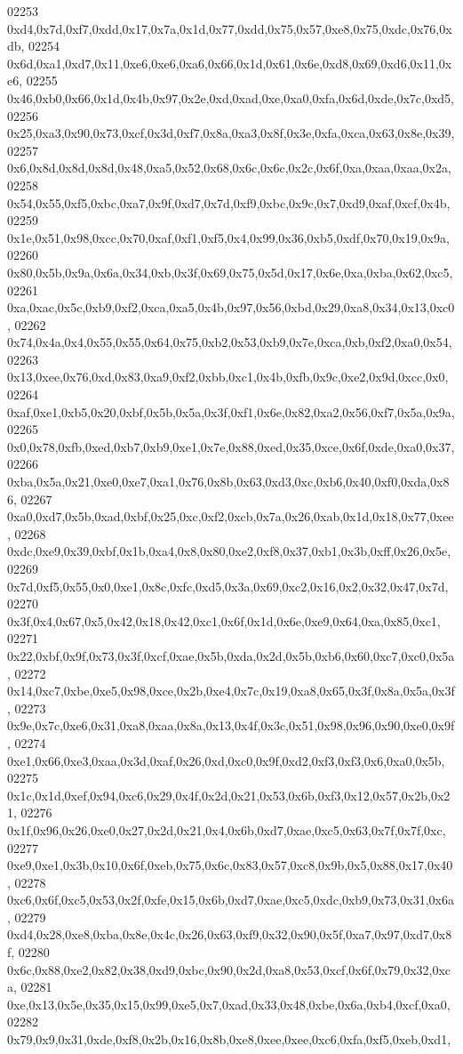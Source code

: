 \begin{DoxyCode}
02253   0xd4,0x7d,0xf7,0xdd,0x17,0x7a,0x1d,0x77,0xdd,0x75,0x57,0xe8,0x75,0xdc,0x76,0xdb,
02254   0x6d,0xa1,0xd7,0x11,0xe6,0xe6,0xa6,0x66,0x1d,0x61,0x6e,0xd8,0x69,0xd6,0x11,0xe6,
02255   0x46,0xb0,0x66,0x1d,0x4b,0x97,0x2e,0xd,0xad,0xe,0xa0,0xfa,0x6d,0xde,0x7c,0xd5,
02256   0x25,0xa3,0x90,0x73,0xcf,0x3d,0xf7,0x8a,0xa3,0x8f,0x3e,0xfa,0xca,0x63,0x8e,0x39,
02257   0x6,0x8d,0x8d,0x8d,0x48,0xa5,0x52,0x68,0x6c,0x6c,0x2c,0x6f,0xa,0xaa,0xaa,0x2a,
02258   0x54,0x55,0xf5,0xbc,0xa7,0x9f,0xd7,0x7d,0xf9,0xbc,0x9c,0x7,0xd9,0xaf,0xcf,0x4b,
02259   0x1e,0x51,0x98,0xcc,0x70,0xaf,0xf1,0xf5,0x4,0x99,0x36,0xb5,0xdf,0x70,0x19,0x9a,
02260   0x80,0x5b,0x9a,0x6a,0x34,0xb,0x3f,0x69,0x75,0x5d,0x17,0x6e,0xa,0xba,0x62,0xc5,
02261   0xa,0xac,0x5c,0xb9,0xf2,0xca,0xa5,0x4b,0x97,0x56,0xbd,0x29,0xa8,0x34,0x13,0xc0,
02262   0x74,0x4a,0x4,0x55,0x55,0x64,0x75,0xb2,0x53,0xb9,0x7e,0xca,0xb,0xf2,0xa0,0x54,
02263   0x13,0xee,0x76,0xd,0x83,0xa9,0xf2,0xbb,0xc1,0x4b,0xfb,0x9c,0xe2,0x9d,0xcc,0x0,
02264   0xaf,0xe1,0xb5,0x20,0xbf,0x5b,0x5a,0x3f,0xf1,0x6e,0x82,0xa2,0x56,0xf7,0x5a,0x9a,
02265   0x0,0x78,0xfb,0xed,0xb7,0xb9,0xe1,0x7e,0x88,0xed,0x35,0xce,0x6f,0xde,0xa0,0x37,
02266   0xba,0x5a,0x21,0xe0,0xe7,0xa1,0x76,0x8b,0x63,0xd3,0xc,0xb6,0x40,0xf0,0xda,0x86,
02267   0xa0,0xd7,0x5b,0xad,0xbf,0x25,0xc,0xf2,0xcb,0x7a,0x26,0xab,0x1d,0x18,0x77,0xee,
02268   0xdc,0xe9,0x39,0xbf,0x1b,0xa4,0x8,0x80,0xe2,0xf8,0x37,0xb1,0x3b,0xff,0x26,0x5e,
02269   0x7d,0xf5,0x55,0x0,0xe1,0x8c,0xfc,0xd5,0x3a,0x69,0xc2,0x16,0x2,0x32,0x47,0x7d,
02270   0x3f,0x4,0x67,0x5,0x42,0x18,0x42,0xc1,0x6f,0x1d,0x6e,0xe9,0x64,0xa,0x85,0xc1,
02271   0x22,0xbf,0x9f,0x73,0x3f,0xcf,0xae,0x5b,0xda,0x2d,0x5b,0xb6,0x60,0xc7,0xc0,0x5a,
02272   0x14,0xc7,0xbe,0xe5,0x98,0xce,0x2b,0xe4,0x7c,0x19,0xa8,0x65,0x3f,0x8a,0x5a,0x3f,
02273   0x9e,0x7c,0xe6,0x31,0xa8,0xaa,0x8a,0x13,0x4f,0x3c,0x51,0x98,0x96,0x90,0xe0,0x9f,
02274   0xe1,0x66,0xe3,0xaa,0x3d,0xaf,0x26,0xd,0xc0,0x9f,0xd2,0xf3,0xf3,0x6,0xa0,0x5b,
02275   0x1c,0x1d,0xef,0x94,0xc6,0x29,0x4f,0x2d,0x21,0x53,0x6b,0xf3,0x12,0x57,0x2b,0x21,
02276   0x1f,0x96,0x26,0xe0,0x27,0x2d,0x21,0x4,0x6b,0xd7,0xae,0xc5,0x63,0x7f,0x7f,0xc,
02277   0xe9,0xe1,0x3b,0x10,0x6f,0xeb,0x75,0x6c,0x83,0x57,0xc8,0x9b,0x5,0x88,0x17,0x40,
02278   0xc6,0x6f,0xc5,0x53,0x2f,0xfe,0x15,0x6b,0xd7,0xae,0xc5,0xdc,0xb9,0x73,0x31,0x6a,
02279   0xd4,0x28,0xe8,0xba,0x8e,0x4c,0x26,0x63,0xf9,0x32,0x90,0x5f,0xa7,0x97,0xd7,0x8f,
02280   0x6c,0x88,0xe2,0x82,0x38,0xd9,0xbc,0x90,0x2d,0xa8,0x53,0xcf,0x6f,0x79,0x32,0xca,
02281   0xe,0x13,0x5e,0x35,0x15,0x99,0xe5,0x7,0xad,0x33,0x48,0xbe,0x6a,0xb4,0xcf,0xa0,
02282   0x79,0x9,0x31,0xde,0xf8,0x2b,0x16,0x8b,0xe8,0xee,0xee,0xc6,0xfa,0xf5,0xeb,0xd1,

\end{DoxyCode}
